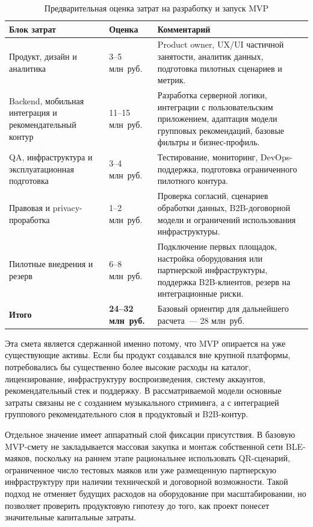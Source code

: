 \begin{table}[htbp]
\centering
\small
\caption{Предварительная оценка затрат на разработку и запуск MVP}
\label{tab:service:mvp-cost}
\begin{tabularx}{\textwidth}{p{}p{}X}
\toprule
Блок затрат & Оценка & Комментарий \\
\midrule
Продукт, дизайн и аналитика & 3--5 млн~руб. & Product owner, UX/UI частичной занятости, аналитик данных, подготовка пилотных сценариев и метрик. \\
\addlinespace
Backend, мобильная интеграция и рекомендательный контур & 11--15 млн~руб. & Разработка серверной логики, интеграции с пользовательским приложением, адаптация модели групповых рекомендаций, базовые фильтры и бизнес-профиль. \\
\addlinespace
QA, инфраструктура и эксплуатационная подготовка & 3--4 млн~руб. & Тестирование, мониторинг, DevOps-поддержка, подготовка ограниченного пилотного контура. \\
\addlinespace
Правовая и privacy-проработка & 1--2 млн~руб. & Проверка согласий, сценариев обработки данных, B2B-договорной модели и ограничений использования инфраструктуры. \\
\addlinespace
Пилотные внедрения и резерв & 6--8 млн~руб. & Подключение первых площадок, настройка оборудования или партнерской инфраструктуры, поддержка B2B-клиентов, резерв на интеграционные риски. \\
\midrule
\textbf{Итого} & \textbf{24--32 млн~руб.} & Базовый ориентир для дальнейшего расчета~--- 28 млн~руб. \\
\bottomrule
\end{tabularx}
\end{table}

Эта смета является сдержанной именно потому, что MVP опирается на уже существующие активы. Если бы продукт создавался вне крупной платформы, потребовались бы существенно более высокие расходы на каталог, лицензирование, инфраструктуру воспроизведения, систему аккаунтов, рекомендательный стек и поддержку. В рассматриваемой модели основные затраты связаны не с созданием музыкального стриминга, а с интеграцией группового рекомендательного слоя в продуктовый и B2B-контур.

Отдельное значение имеет аппаратный слой фиксации присутствия. В базовую MVP-смету не закладывается массовая закупка и монтаж собственной сети BLE-маяков, поскольку на раннем этапе рациональнее использовать QR-сценарий, ограниченное число тестовых маяков или уже размещенную партнерскую инфраструктуру при наличии технической и договорной возможности. Такой подход не отменяет будущих расходов на оборудование при масштабировании, но позволяет проверить продуктовую гипотезу до того, как проект понесет значительные капитальные затраты.

